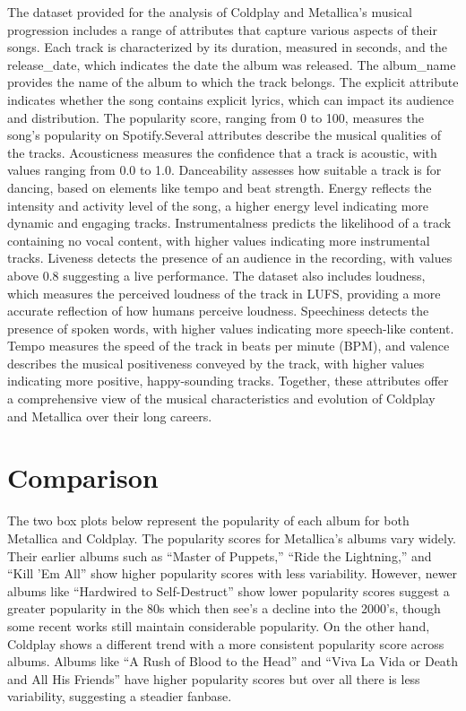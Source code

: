\documentclass[11pt,preprint, authoryear]{elsarticle}
\numberwithin{equation}{section}
\numberwithin{figure}{section}
\numberwithin{table}{section}
\begin{document}
The dataset provided for the analysis of Coldplay and Metallica's
musical progression includes a range of attributes that capture various
aspects of their songs. Each track is characterized by its duration,
measured in seconds, and the release\_date, which indicates the date the
album was released. The album\_name provides the name of the album to
which the track belongs. The explicit attribute indicates whether the
song contains explicit lyrics, which can impact its audience and
distribution. The popularity score, ranging from 0 to 100, measures the
song's popularity on Spotify.Several attributes describe the musical
qualities of the tracks. Acousticness measures the confidence that a
track is acoustic, with values ranging from 0.0 to 1.0. Danceability
assesses how suitable a track is for dancing, based on elements like
tempo and beat strength. Energy reflects the intensity and activity
level of the song, a higher energy level indicating more dynamic and
engaging tracks. Instrumentalness predicts the likelihood of a track
containing no vocal content, with higher values indicating more
instrumental tracks. Liveness detects the presence of an audience in the
recording, with values above 0.8 suggesting a live performance. The
dataset also includes loudness, which measures the perceived loudness of
the track in LUFS, providing a more accurate reflection of how humans
perceive loudness. Speechiness detects the presence of spoken words,
with higher values indicating more speech-like content. Tempo measures
the speed of the track in beats per minute (BPM), and valence describes
the musical positiveness conveyed by the track, with higher values
indicating more positive, happy-sounding tracks. Together, these
attributes offer a comprehensive view of the musical characteristics and
evolution of Coldplay and Metallica over their long careers.

\section{Comparison}\label{comparison}

The two box plots below represent the popularity of each album for both
Metallica and Coldplay. The popularity scores for Metallica's albums
vary widely. Their earlier albums such as ``Master of Puppets,'' ``Ride
the Lightning,'' and ``Kill 'Em All'' show higher popularity scores with
less variability. However, newer albums like ``Hardwired to
Self-Destruct'' show lower popularity scores suggest a greater
popularity in the 80s which then see's a decline into the 2000's, though
some recent works still maintain considerable popularity. On the other
hand, Coldplay shows a different trend with a more consistent popularity
score across albums. Albums like ``A Rush of Blood to the Head'' and
``Viva La Vida or Death and All His Friends'' have higher popularity
scores but over all there is less variability, suggesting a steadier
fanbase.
\end{document}
